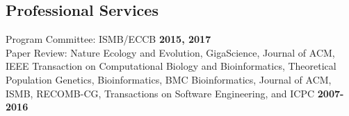 \documentclass[margin,line,letterpaper]{resume}
\begin{document}
\begin{resume}
    \section{\mysidestyle Professional Services}
    Program Committee: ISMB/ECCB  \hfill \textbf{2015, 2017}\vspace{1mm}\\
    Paper Review:  Nature Ecology and Evolution, GigaScience, Journal of ACM, IEEE Transaction on Computational Biology and Bioinformatics, Theoretical Population Genetics, Bioinformatics, BMC Bioinformatics, Journal of ACM, ISMB, RECOMB-CG, Transactions on Software Engineering, and ICPC    \hfill \textbf{2007-2016}\vspace{1mm}

\end{resume}
\end{document}
